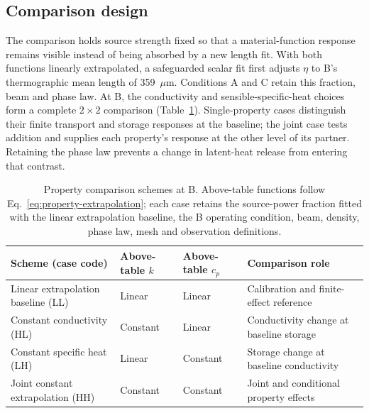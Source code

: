 \documentclass[preprint,12pt]{elsarticle}
\newcommand{\um}{\ensuremath{\mu\mathrm{m}}}
\begin{document}
\subsection{Comparison design}
\label{sec:comparison-design}
The comparison holds source strength fixed so that a material-function response remains visible instead of being absorbed by a new length fit. With both functions linearly extrapolated, a safeguarded scalar fit first adjusts $\eta$ to B's thermographic mean length of 359~\um. Conditions A and C retain this fraction, beam and phase law. At B, the conductivity and sensible-specific-heat choices form a complete $2\times2$ comparison (Table~\ref{tab:comparison-design}). Single-property cases distinguish their finite transport and storage responses at the baseline; the joint case tests addition and supplies each property's response at the other level of its partner. Retaining the phase law prevents a change in latent-heat release from entering that contrast.

\begin{table}[htbp]
\centering
\small
\caption{Property comparison schemes at B. Above-table functions follow Eq.~\eqref{eq:property-extrapolation}; each case retains the source-power fraction fitted with the linear extrapolation baseline, the B operating condition, beam, density, phase law, mesh and observation definitions.}
\label{tab:comparison-design}
\begin{tabular}{>{\raggedright\arraybackslash}p{}ll>{\raggedright\arraybackslash}p{}}
\toprule
Scheme (case code) & Above-table $k$ & Above-table $c_p$ & Comparison role\\
\midrule
Linear extrapolation baseline (LL) & Linear & Linear & Calibration and finite-effect reference\\
Constant conductivity (HL) & Constant & Linear & Conductivity change at baseline storage\\
Constant specific heat (LH) & Linear & Constant & Storage change at baseline conductivity\\
Joint constant extrapolation (HH) & Constant & Constant & Joint and conditional property effects\\
\bottomrule
\end{tabular}
\end{table}
\end{document}
